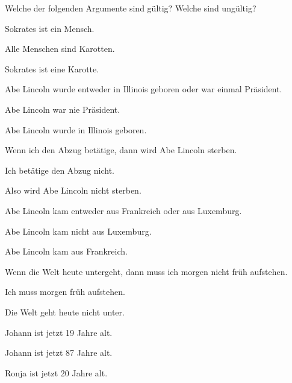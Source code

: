 \practiceproblems
\problempart
Welche der folgenden Argumente sind gültig? Welche sind ungültig?

\begin{earg}
\item Sokrates ist ein Mensch.
\item Alle Menschen sind Karotten.
\item[\therefore] Sokrates ist eine Karotte.
\end{earg}

\begin{earg}
\item Abe Lincoln wurde entweder in Illinois geboren oder war einmal Präsident.
\item Abe Lincoln war nie Präsident.
\item[\therefore] Abe Lincoln wurde in Illinois geboren.
\end{earg}

\begin{earg}
\item Wenn ich den Abzug betätige, dann wird Abe Lincoln sterben.
\item Ich betätige den Abzug nicht.
\item[\therefore] Also wird Abe Lincoln nicht sterben.
\end{earg}

\begin{earg}
\item Abe Lincoln kam entweder aus Frankreich oder aus Luxemburg.
\item Abe Lincoln kam nicht aus Luxemburg.
\item[\therefore] Abe Lincoln kam aus Frankreich.
\end{earg}

\begin{earg}
\item Wenn die Welt heute untergeht, dann muss ich morgen nicht früh aufstehen.
\item Ich muss morgen früh aufstehen.
\item[\therefore] Die Welt geht heute nicht unter.
\end{earg}

\begin{earg}
\item Johann ist jetzt 19 Jahre alt.
\item Johann ist jetzt 87 Jahre alt.
\item[\therefore] Ronja ist jetzt 20 Jahre alt.
\end{earg}

